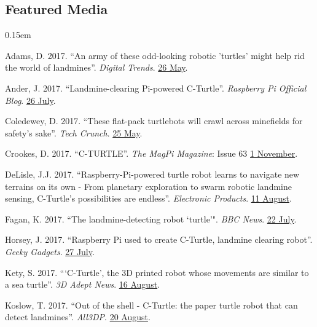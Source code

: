 \documentclass[12pt,a4paper]{article}
\begin{document}
\subsection*{Featured Media}
\begin{description}
	\itemsep0.15em
	\item Adams, D. 2017. ``An army of these odd-looking robotic 'turtles' might help rid the world of landmines''. \textit{Digital Trends}. \href{https://www.digitaltrends.com/cool-tech/robot-turtles-detect-landmines/}{26 May}.
	\item Ander, J. 2017. ``Landmine-clearing Pi-powered C-Turtle''. \textit{Raspberry Pi Official Blog}. \href{https://www.raspberrypi.org/blog/landmine-c-turtle/}{26 July}.
	\item Coledewey, D. 2017. ``These flat-pack turtlebots will crawl across minefields for safety's sake''. \textit{Tech Crunch}. \href{https://techcrunch.com/2017/05/25/these-flat-pack-turtlebots-will-crawl-across-minefields-for-safetys-sake/}{25 May}.
	\item Crookes, D. 2017. ``C-TURTLE''. \textit{The MagPi Magazine}: Issue 63 \href{https://www.raspberrypi.org/magpi/c-turtle/}{1 November}.
	\item DeLisle, J.J. 2017. ``Raspberry-Pi-powered turtle robot learns to navigate new terrains on its own - From planetary exploration to swarm robotic landmine sensing, C-Turtle's possibilities are endless''. \textit{Electronic Products}. \href{https://www.electronicproducts.com/Robotics/AI/Raspberry_Pi_powered_turtle_robot_learns_to_navigate_new_terrains_on_its_own.aspx}{11 August}.
	\item Fagan, K. 2017. ``The landmine-detecting robot `turtle'". \textit{BBC News}. \href{http://www.bbc.com/news/av/technology-40296297/the-soft-3d-printed-robot-that-could-come-to-the-rescue}{22 July}.
	\item Horsey, J. 2017. ``Raspberry Pi used to create C-Turtle, landmine clearing robot''. \textit{Geeky Gadgets}. \href{https://www.geeky-gadgets.com/landmine-clearing-robot-27-07-2017/}{27 July}.
	\item Kety, S. 2017. ```C-Turtle', the 3D printed robot whose movements are similar to a sea turtle''. \textit{3D Adept News}. \href{https://3dadept.com/c-turtle-the-3d-printed-robot-whose-movements-are-similar-to-a-sea-turtle/}{16 August}.
	\item Koslow, T. 2017. ``Out of the shell - C-Turtle: the paper turtle robot that can detect landmines''. \textit{All3DP}. \href{https://all3dp.com/landmine-detecting-robot-c-turtle/}{20 August}.

\end{description}
\end{document}
